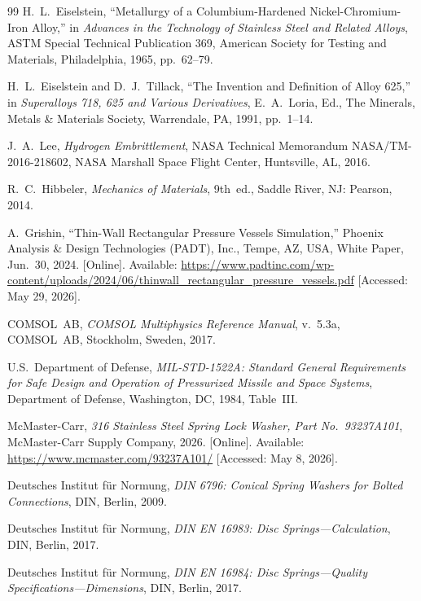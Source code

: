 \documentclass[12pt, letterpaper]{report}%
\begin{document}
\begin{thebibliography}{99}
	H.\ L.\ Eiselstein,
	``Metallurgy of a Columbium-Hardened Nickel-Chromium-Iron Alloy,''
	in \textit{Advances in the Technology of Stainless Steel and Related Alloys},
	ASTM Special Technical Publication 369,
	American Society for Testing and Materials, Philadelphia, 1965, pp.~62--79.

	H.\ L.\ Eiselstein and D.\ J.\ Tillack,
	``The Invention and Definition of Alloy 625,''
	in \textit{Superalloys 718, 625 and Various Derivatives},
	E.\ A.\ Loria, Ed., The Minerals, Metals \& Materials Society,
	Warrendale, PA, 1991, pp.~1--14.

	J.\ A.\ Lee, \textit{Hydrogen Embrittlement},
	NASA Technical Memorandum NASA/TM-2016-218602,
	NASA Marshall Space Flight Center, Huntsville, AL, 2016.

	R.\ C.\ Hibbeler, \textit{Mechanics of Materials},
	9th~ed., Saddle River, NJ: Pearson, 2014.

	A.\ Grishin, ``Thin-Wall Rectangular Pressure Vessels Simulation,''
	Phoenix Analysis \& Design Technologies (PADT), Inc.,
	Tempe, AZ, USA, White Paper, Jun.\ 30, 2024. [Online].
	Available: \url{https://www.padtinc.com/wp-content/uploads/2024/06/thinwall_rectangular_pressure_vessels.pdf}
	[Accessed: May 29, 2026].

	COMSOL~AB, \textit{COMSOL Multiphysics\textregistered{} Reference Manual},
	v.~5.3a, COMSOL~AB, Stockholm, Sweden, 2017.

	U.S.\ Department of Defense,
	\textit{MIL-STD-1522A: Standard General Requirements for Safe Design and
	Operation of Pressurized Missile and Space Systems},
	Department of Defense, Washington, DC, 1984, Table~III.

	McMaster-Carr, \textit{316 Stainless Steel Spring Lock Washer,
	Part No.\ 93237A101}, McMaster-Carr Supply Company, 2026. [Online].
	Available: \url{https://www.mcmaster.com/93237A101/}
	[Accessed: May 8, 2026].

	Deutsches Institut f\"{u}r Normung,
	\textit{DIN 6796: Conical Spring Washers for Bolted Connections},
	DIN, Berlin, 2009.

	Deutsches Institut f\"{u}r Normung,
	\textit{DIN EN 16983: Disc Springs---Calculation}, DIN, Berlin, 2017.

	Deutsches Institut f\"{u}r Normung,
	\textit{DIN EN 16984: Disc Springs---Quality Specifications---Dimensions},
	DIN, Berlin, 2017.


\end{thebibliography}
\end{document}
